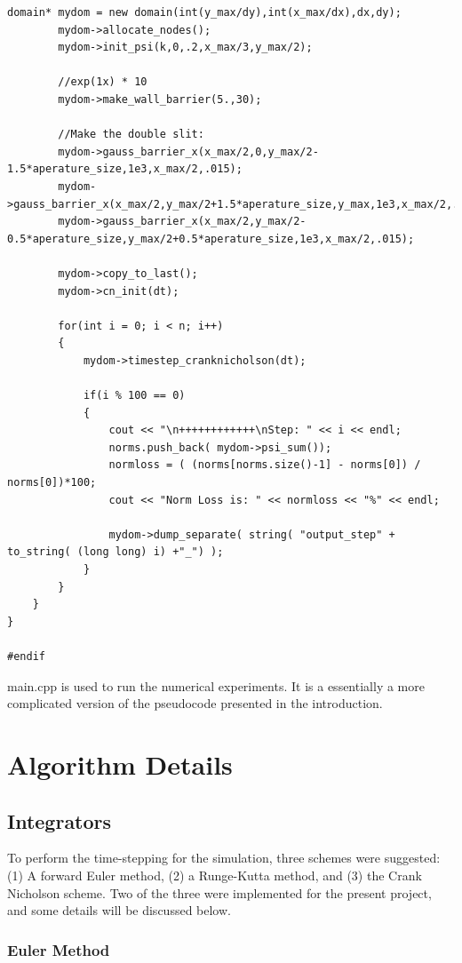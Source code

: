 \documentclass[letterpaper,12pt]{article}
\begin{document}
\begin{lstlisting}[caption=examples.h]
		domain* mydom = new domain(int(y_max/dy),int(x_max/dx),dx,dy);
		mydom->allocate_nodes();
		mydom->init_psi(k,0,.2,x_max/3,y_max/2);
		
		//exp(1x) * 10
		mydom->make_wall_barrier(5.,30);
		
		//Make the double slit:
		mydom->gauss_barrier_x(x_max/2,0,y_max/2-1.5*aperature_size,1e3,x_max/2,.015);
		mydom->gauss_barrier_x(x_max/2,y_max/2+1.5*aperature_size,y_max,1e3,x_max/2,.015);
		mydom->gauss_barrier_x(x_max/2,y_max/2-0.5*aperature_size,y_max/2+0.5*aperature_size,1e3,x_max/2,.015);
				
		mydom->copy_to_last();
		mydom->cn_init(dt);

		for(int i = 0; i < n; i++)
		{			
			mydom->timestep_cranknicholson(dt);
			
			if(i % 100 == 0)
			{
				cout << "\n++++++++++++\nStep: " << i << endl;
				norms.push_back( mydom->psi_sum());
				normloss = ( (norms[norms.size()-1] - norms[0]) / norms[0])*100;
				cout << "Norm Loss is: " << normloss << "%" << endl;

				mydom->dump_separate( string( "output_step" + to_string( (long long) i) +"_") );
			}
		}
	}
}

#endif
\end{lstlisting}

\vspace{5mm}


\vspace{5mm}

main.cpp is used to run the numerical experiments.  It is a essentially a more complicated version of the pseudocode presented in the introduction.  

\section{Algorithm Details}

\subsection{Integrators}

To perform the time-stepping for the simulation, three schemes were suggested: (1) A forward Euler method, (2) a Runge-Kutta method, and (3) the Crank Nicholson scheme. Two of the three were implemented for the present project, and some details will be discussed below.

\subsubsection{Euler Method}
\end{document}
